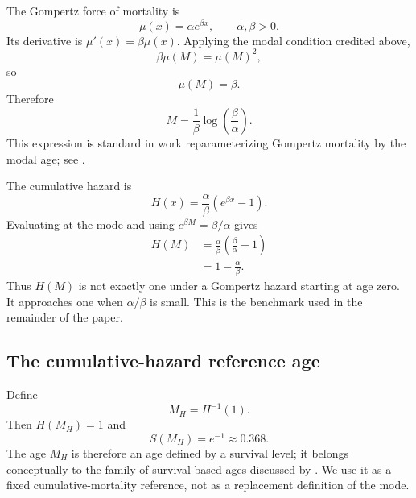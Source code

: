 \documentclass[doublespace]{interact}
\begin{document}
The Gompertz force of mortality \citep{Gompertz1825,PollardValkovics1992} is
\begin{equation}
\mu(x)=\alpha e^{\beta x}, \qquad \alpha,\beta>0.
\end{equation}
Its derivative is $\mu'(x)=\beta\mu(x)$. Applying the modal condition credited above,
\begin{equation}
\beta\mu(M)=\mu(M)^2,
\end{equation}
so
\begin{equation}
\mu(M)=\beta.
\end{equation}
Therefore
\begin{equation}
\boxed{M=\frac{1}{\beta}\log\left(\frac{\beta}{\alpha}\right).}
\end{equation}
This expression is standard in work reparameterizing Gompertz mortality by the modal age; see \citet{MissovEtAl2015}.

The cumulative hazard is
\begin{equation}
H(x)=\frac{\alpha}{\beta}\left(e^{\beta x}-1\right).
\end{equation}
Evaluating at the mode and using $e^{\beta M}=\beta/\alpha$ gives
\begin{align}
H(M)
&=\frac{\alpha}{\beta}\left(\frac{\beta}{\alpha}-1\right)\\
&=\boxed{1-\frac{\alpha}{\beta}}.
\end{align}
Thus $H(M)$ is not exactly one under a Gompertz hazard starting at age zero. It approaches one when $\alpha/\beta$ is small. This is the benchmark used in the remainder of the paper.

\subsection{The cumulative-hazard reference age}

Define
\begin{equation}
\boxed{M_H=H^{-1}(1).}
\end{equation}
Then $H(M_H)=1$ and
\begin{equation}
S(M_H)=e^{-1}\approx0.368.
\end{equation}
The age $M_H$ is therefore an age defined by a survival level; it belongs conceptually to the family of survival-based ages discussed by \citet{AlvarezVaupel2023}. We use it as a fixed cumulative-mortality reference, not as a replacement definition of the mode.
\end{document}
